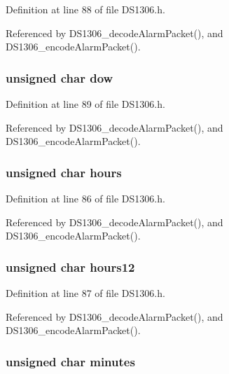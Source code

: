 Definition at line 88 of file D\-S1306.\-h.



Referenced by D\-S1306\-\_\-decode\-Alarm\-Packet(), and D\-S1306\-\_\-encode\-Alarm\-Packet().

\hypertarget{structds1306alarm_a75aeb148620066973ea11791d72dc7cc}{
\subsubsection[{dow}]{\setlength{\rightskip}{0pt plus 5cm}unsigned char dow}}\label{structds1306alarm_a75aeb148620066973ea11791d72dc7cc}


Definition at line 89 of file D\-S1306.\-h.



Referenced by D\-S1306\-\_\-decode\-Alarm\-Packet(), and D\-S1306\-\_\-encode\-Alarm\-Packet().

\hypertarget{structds1306alarm_ad6bf06b59feb7f83117fd66cd2f365ad}{
\subsubsection[{hours}]{\setlength{\rightskip}{0pt plus 5cm}unsigned char hours}}\label{structds1306alarm_ad6bf06b59feb7f83117fd66cd2f365ad}


Definition at line 86 of file D\-S1306.\-h.



Referenced by D\-S1306\-\_\-decode\-Alarm\-Packet(), and D\-S1306\-\_\-encode\-Alarm\-Packet().

\hypertarget{structds1306alarm_ab51bff648a0be672b522ac48e8da69fc}{
\subsubsection[{hours12}]{\setlength{\rightskip}{0pt plus 5cm}unsigned char hours12}}\label{structds1306alarm_ab51bff648a0be672b522ac48e8da69fc}


Definition at line 87 of file D\-S1306.\-h.



Referenced by D\-S1306\-\_\-decode\-Alarm\-Packet(), and D\-S1306\-\_\-encode\-Alarm\-Packet().

\hypertarget{structds1306alarm_acf4ceb0d1cb80a37559ed7fd414cd389}{
\subsubsection[{minutes}]{\setlength{\rightskip}{0pt plus 5cm}unsigned char minutes}}\label{structds1306alarm_acf4ceb0d1cb80a37559ed7fd414cd389}


